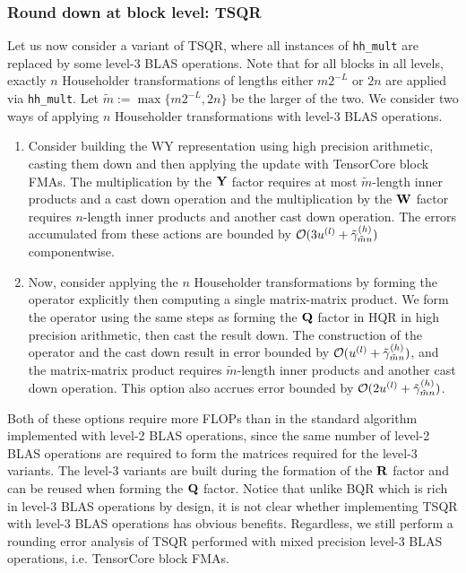 \subsubsection{Round down at block level: TSQR}\label{sec:mp-3t}
%
Let us now consider a variant of TSQR, where all instances of {\tt hh\_mult} are replaced by some level-3 BLAS operations.
Note that for all blocks in all levels, exactly $n$ Householder transformations of lengths either $m2^{-L}$ or $2n$ are applied via {\tt hh\_mult}.
Let $\tilde{m} := \max\{m2^{-L},2n\}$ be the larger of the two. 
We consider two ways of applying $n$ Householder transformations with level-3 BLAS operations.
\begin{enumerate}
	\item Consider building the WY representation using high precision arithmetic, casting them down and then applying the update with TensorCore block FMAs.
	The multiplication by the $\mathbf{Y}$ factor requires at most $\tilde{m}$-length inner products and a cast down operation and the multiplication by the $\mathbf{W}$ factor requires $n$-length inner products and another cast down operation.
	The errors accumulated from these actions are bounded by $\mathcal{O}(3u^{(l)}+\tilde{\gamma}_{\tilde{m}n}^{(h)})$ componentwise.
	\item Now, consider applying the $n$ Householder transformations by forming the operator explicitly then computing a single matrix-matrix product.
	We form the operator using the same steps as forming the $\mathbf{Q}$ factor in HQR in high precision arithmetic, then cast the result down. 
	The construction of the operator and the cast down result in error bounded by $\mathcal{O}(u^{(l)}+\tilde{\gamma}_{\tilde{m}n}^{(h)})$, and the matrix-matrix product requires $\tilde{m}$-length inner products and another cast down operation. 
	This option also accrues error bounded by $\mathcal{O}(2u^{(l)}+\tilde{\gamma}_{\tilde{m}n}^{(h)})$.
\end{enumerate}

Both of these options require more FLOPs than in the standard algorithm implemented with level-2 BLAS operations, since the same number of level-2 BLAS operations are required to form the matrices required for the level-3 variants. 
The level-3 variants are built during the formation of the $\mathbf{R}$ factor and can be reused when forming the $\mathbf{Q}$ factor.
Notice that unlike BQR which is rich in level-3 BLAS operations by design, it is not clear whether implementing TSQR with level-3 BLAS operations has obvious benefits.
Regardless, we still perform a rounding error analysis of TSQR performed with mixed precision level-3 BLAS operations, i.e. TensorCore block FMAs.

